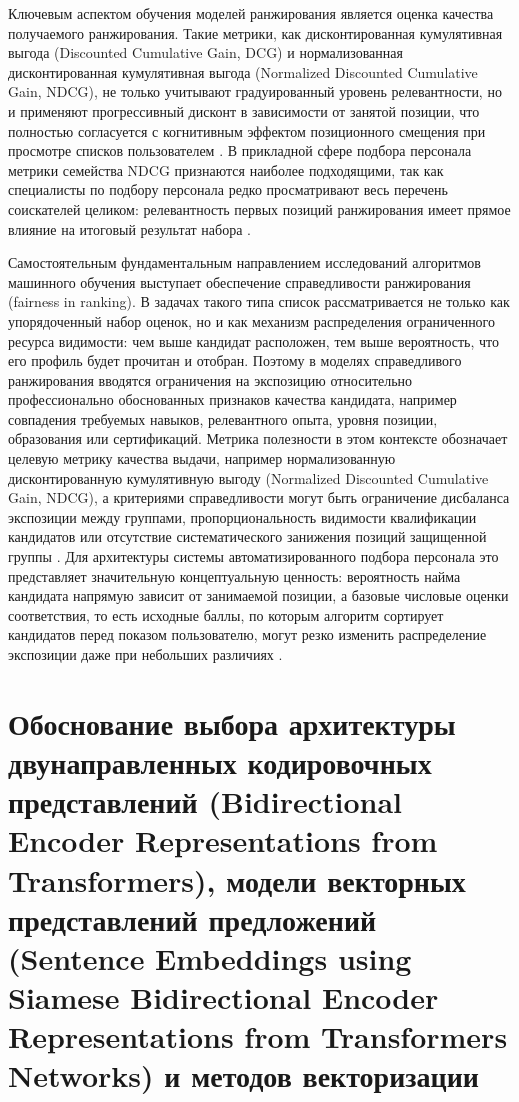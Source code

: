 Ключевым аспектом обучения моделей ранжирования является оценка качества получаемого ранжирования. Такие метрики, как дисконтированная кумулятивная выгода (Discounted Cumulative Gain, DCG) и нормализованная дисконтированная кумулятивная выгода (Normalized Discounted Cumulative Gain, NDCG), не только учитывают градуированный уровень релевантности, но и применяют прогрессивный дисконт в зависимости от занятой позиции, что полностью согласуется с когнитивным эффектом позиционного смещения при просмотре списков пользователем \cite{src10}. В прикладной сфере подбора персонала метрики семейства NDCG признаются наиболее подходящими, так как специалисты по подбору персонала редко просматривают весь перечень соискателей целиком: релевантность первых позиций ранжирования имеет прямое влияние на итоговый результат набора \cite{src02, src16}.

Самостоятельным фундаментальным направлением исследований алгоритмов машинного обучения выступает обеспечение справедливости ранжирования (fairness in ranking). В задачах такого типа список рассматривается не только как упорядоченный набор оценок, но и как механизм распределения ограниченного ресурса видимости: чем выше кандидат расположен, тем выше вероятность, что его профиль будет прочитан и отобран. Поэтому в моделях справедливого ранжирования вводятся ограничения на экспозицию относительно профессионально обоснованных признаков качества кандидата, например совпадения требуемых навыков, релевантного опыта, уровня позиции, образования или сертификаций. Метрика полезности в этом контексте обозначает целевую метрику качества выдачи, например нормализованную дисконтированную кумулятивную выгоду (Normalized Discounted Cumulative Gain, NDCG), а критериями справедливости могут быть ограничение дисбаланса экспозиции между группами, пропорциональность видимости квалификации кандидатов или отсутствие систематического занижения позиций защищенной группы \cite{src16, src36, src37}. Для архитектуры системы автоматизированного подбора персонала это представляет значительную концептуальную ценность: вероятность найма кандидата напрямую зависит от занимаемой позиции, а базовые числовые оценки соответствия, то есть исходные баллы, по которым алгоритм сортирует кандидатов перед показом пользователю, могут резко изменить распределение экспозиции даже при небольших различиях \cite{src02, src16}.

\section{Обоснование выбора архитектуры двунаправленных кодировочных представлений (Bidirectional Encoder Representations from Transformers), модели векторных представлений предложений (Sentence Embeddings using Siamese Bidirectional Encoder Representations from Transformers Networks) и методов векторизации}

